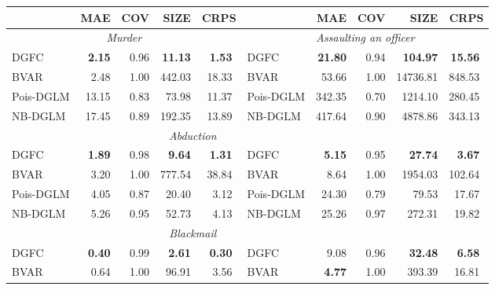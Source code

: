 \begin{tabular}{@{}lrrrr@{\qquad}lrrrr@{}}
\toprule
 & MAE & COV & SIZE & CRPS &  & MAE & COV & SIZE & CRPS \\
\midrule
\multicolumn{5}{c}{\textit{Murder}} & \multicolumn{5}{c}{\textit{Assaulting an officer}} \\
\cmidrule(r){1-5}\cmidrule(l){6-10}
DGFC      & \textbf{2.15} & 0.96 & \textbf{11.13} & \textbf{1.53}$^{\phantom{\dagger}}$ & DGFC      & \textbf{21.80} & 0.94 & \textbf{104.97} & \textbf{15.56}$^{\phantom{\dagger}}$ \\
BVAR      & 2.48 & 1.00 & 442.03 & 18.33$^{\phantom{\dagger}}$ & BVAR      & 53.66 & 1.00 & 14736.81 & 848.53$^{\phantom{\dagger}}$ \\
Pois-DGLM & 13.15 & 0.83 & 73.98 & 11.37$^{\phantom{\dagger}}$ & Pois-DGLM & 342.35 & 0.70 & 1214.10 & 280.45$^{\phantom{\dagger}}$ \\
NB-DGLM   & 17.45 & 0.89 & 192.35 & 13.89$^{\phantom{\dagger}}$ & NB-DGLM   & 417.64 & 0.90 & 4878.86 & 343.13$^{\phantom{\dagger}}$ \\
\addlinespace
\multicolumn{5}{c}{\textit{Attempted murder}} & \multicolumn{5}{c}{\textit{Abduction}} \\
\cmidrule(r){1-5}\cmidrule(l){6-10}
DGFC      & \textbf{1.89} & 0.98 & \textbf{9.64} & \textbf{1.31}$^{\phantom{\dagger}}$ & DGFC      & \textbf{5.15} & 0.95 & \textbf{27.74} & \textbf{3.67}$^{\phantom{\dagger}}$ \\
BVAR      & 3.20 & 1.00 & 777.54 & 38.84$^{\phantom{\dagger}}$ & BVAR      & 8.64 & 1.00 & 1954.03 & 102.64$^{\phantom{\dagger}}$ \\
Pois-DGLM & 4.05 & 0.87 & 20.40 & 3.12$^{\phantom{\dagger}}$ & Pois-DGLM & 24.30 & 0.79 & 79.53 & 17.67$^{\phantom{\dagger}}$ \\
NB-DGLM   & 5.26 & 0.95 & 52.73 & 4.13$^{\phantom{\dagger}}$ & NB-DGLM   & 25.26 & 0.97 & 272.31 & 19.82$^{\phantom{\dagger}}$ \\
\addlinespace
\multicolumn{5}{c}{\textit{Accessory to murder}} & \multicolumn{5}{c}{\textit{Blackmail}} \\
\cmidrule(r){1-5}\cmidrule(l){6-10}
DGFC      & \textbf{0.40} & 0.99 & \textbf{2.61} & \textbf{0.30}$^{\phantom{\dagger}}$ & DGFC      & 9.08 & 0.96 & \textbf{32.48} & \textbf{6.58}$^{\phantom{\dagger}}$ \\
BVAR      & 0.64 & 1.00 & 96.91 & 3.56$^{\phantom{\dagger}}$ & BVAR      & \textbf{4.77} & 1.00 & 393.39 & 16.81$^{\phantom{\dagger}}$ \\

\end{tabular}
